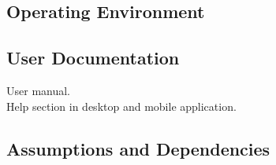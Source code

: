 \documentclass{article}
\begin{document}
\subsection{Operating Environment}


\subsection{User Documentation}
User manual.\\
Help section in desktop and mobile application.

\subsection{Assumptions and Dependencies}
\end{document}
